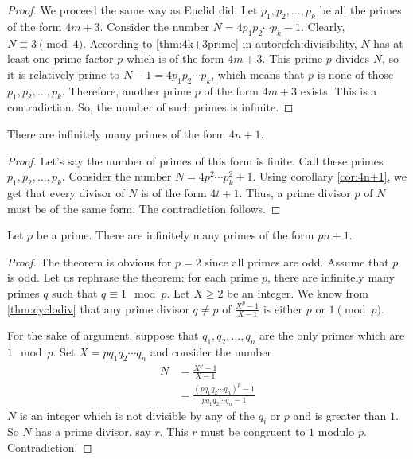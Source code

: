 	\begin{proof}
		We proceed the same way as Euclid did. Let $p_1,p_2,\ldots,p_k$ be all the primes of the form $4m+3$. Consider the number $N=4p_1p_2\cdots p_k-1$. Clearly, $N\equiv3\pmod4$. According to \autoref{thm:4k+3prime} in autoref{ch:divisibility}, $N$ has at least one prime factor $p$ which is of the form $4m+3$. This prime $p$ divides $N$, so it is relatively prime to $N-1=4p_1p_2\cdots p_k$, which means that $p$ is none of those $p_1,p_2,\ldots,p_k$. Therefore, another prime $p$ of the form $4m+3$ exists. This is a contradiction. So, the number of such primes is infinite.
	\end{proof}

	\begin{theorem}
		There are infinitely many primes of the form $4n+1$.
	\end{theorem}

	\begin{proof}
		Let's say the number of primes of this form is finite. Call these primes $p_1,p_2,\ldots,p_k$. Consider the number $N=4p_1^2\cdots p_k^2+1$. Using corollary \eqref{cor:4n+1}, we get that every divisor of $N$ is of the form $4t+1$. Thus, a prime divisor $p$ of $N$ must be of the same form. The contradiction follows.
	\end{proof}

	\begin{theorem}
		Let $p$ be a prime. There are infinitely many primes of the form $pn+1$.
	\end{theorem}

	\begin{proof}
		The theorem is obvious for $p=2$ since all primes are odd. Assume that $p$ is odd. Let us rephrase the theorem: for each prime $p$, there are infinitely many primes $q$ such that $q\equiv1\mod{p}$. Let $X \geq 2$ be an integer. We know from \autoref{thm:cyclodiv} that any prime divisor $q \neq p$ of $\frac{X^{p}-1}{X-1}$ is either $p$ or $1 \pmod p$.

		For the sake of argument, suppose that $q_{1},q_{2},\ldots,q_{n}$ are the only primes which are $1\mod{p}$. Set $X=pq_{1}q_{2}\cdots q_{n}$ and consider the number
			\begin{align*}
				N & =\frac{X^{p}-1}{X-1}\\
		  & = \frac{(pq_1q_2\cdots q_n)^p-1}{pq_1q_2\cdots q_n-1}
			\end{align*}
		$N$ is an integer which is not divisible by any of the $q_{i}$ or $p$ and is greater than $1$. So $N$ has a prime divisor, say $r$. This $r$ must be congruent to $1$ modulo $p$. Contradiction!
	\end{proof}

